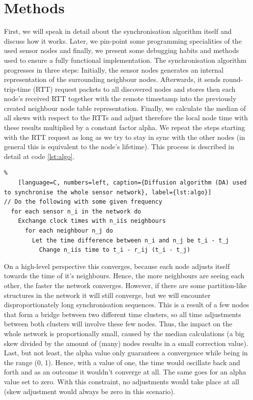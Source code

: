 \documentclass{llncs}
\begin{document}
\section{Methods}

First, we will speak in detail about the synchronisation algorithm itself and discuss how it works. Later, we pin-point some programming specialities of the used sensor nodes and finally, we present some debugging habits and methods used to ensure a fully functional implementation.
\bigbreak
\noindent The synchronisation algorithm progresses in three steps: Initially, the sensor nodes generates an internal representation of the surrounding neighbour nodes. Afterwards, it sends round-trip-time (RTT) request packets to all discovered nodes and stores then each node's received RTT together with the remote timestamp into the previously created neighbour node table representation. Finally, we calculate the median of all skews with respect to the RTTs and adjust therefore the local node time with these results multiplied by a constant factor alpha. We repeat the steps starting with the RTT request as long as we try to stay in sync with the other nodes (in general this is equivalent to the node's lifetime). This process is described in detail at code \ref{lst:algo}.

\begin{lstlisting}%
	[language=C, numbers=left, caption={Diffusion algorithm (DA) used to synchronise the whole sensor network}, label={lst:algo}]
// Do the following with some given frequency
  for each sensor n_i in the network do
    Exchange clock times with n_iís neighbours
      for each neighbour n_j do
        Let the time difference between n_i and n_j be t_i - t_j
          Change n_iís time to t_i - r_ij (t_i - t_j)
\end{lstlisting}

\noindent On a high-level perspective this converges, because each node adjusts itself towards the time of it's neighbours. Hence, the more neighbours are seeing each other, the faster the network converges. However, if there are some partition-like structures in the network it will still converge, but we will encounter disproportionately long synchronisation sequences. This is a result of a few nodes that form a bridge between two different time clusters, so all time adjustments between both clusters will involve these few nodes. Thus, the impact on the whole network is proportionally small, caused by the median calculations (a big skew divided by the amount of (many) nodes results in a small correction value). Last, but not least, the alpha value only guarantees a convergence while being in the range (0, 1). Hence, with a value of one, the time would oscillate back and forth and as an outcome it wouldn't converge at all. The same goes for an alpha value set to zero. With this constraint, no adjustments would take place at all (skew adjustment would always be zero in this scenario).
\end{document}
